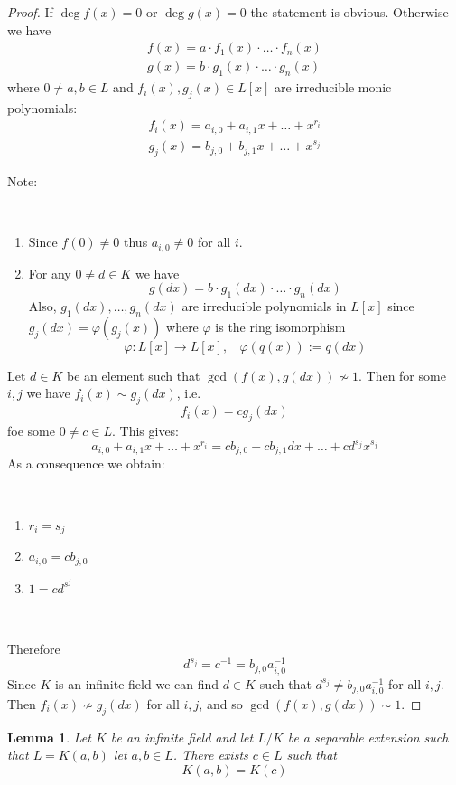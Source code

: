 \documentclass[12pt, letterpaper, oneside]{article}
\theoremstyle{plain}
\newtheorem{lemma}[theorem]{Lemma}
\theoremstyle{definition}
\newcommand{\benu}{\begin{enumerate}}
\newcommand{\eenu}{\end{enumerate}}
\newcommand{\vs}{\vskip 5mm}
\newcommand{\isep}[1][0]{\setlength{\itemsep}{#1 mm}}
\begin{document}
\begin{proof}
If $\deg f(x) = 0$ or $\deg g(x)=0$ the statement is obvious. 
Otherwise we have 
\begin{align*}
f(x) = a\cdot f_{1}(x)\cdot {\dots}\cdot f_{n}(x)\\
g(x) = b\cdot g_{1}(x)\cdot {\dots}\cdot g_{n}(x)
\end{align*} 
where $0\neq a, b\in L$ and $f_{i}(x), g_{j}(x)\in L[x]$ are irreducible monic polynomials:
\begin{align*}
f_{i}(x) = a_{i, 0} + a_{i, 1}x+ {\dots} + x^{r_{i}} \\
g_{j}(x) = b_{j, 0} + b_{j, 1}x+ {\dots} + x^{s_{j}}
\end{align*}

Note:

\vskip -13mm

\ 
\benu
\item Since $f(0)\neq 0$ thus $a_{i, 0}\neq 0$ for all $i$.
\item For any $0\neq d\in K$ we have 
$$g(dx) = b\cdot g_{1}(dx)\cdot {\dots}\cdot g_{n}(dx)$$
Also,  $g_{1}(dx), \dots, g_{n}(dx)$ are irreducible polynomials in $L[x]$ since 
$g_{j}(dx) = \varphi(g_{j}(x))$ where $\varphi$ is the ring isomorphism
$$\varphi\colon L[x] \to L[x], \ \ \ \ \varphi(q(x)) := q(dx)$$
\eenu

Let $d\in K$ be an element such that  $\gcd(f(x), g(dx))\not \sim 1$. Then for some $i, j$ we have 
$f_{i}(x)\sim g_{j}(dx)$, i.e. 
$$f_{i}(x) = cg_{j}(dx)$$
foe some $0\neq c \in L$. 
This gives:
$$a_{i, 0} + a_{i, 1}x + \dots + x^{r_{i}} = cb_{j, 0} + cb_{j, 1}dx + \dots +  cd^{s_{j}}x^{s_{j}}$$
As a consequence we obtain:

\vskip -13mm

\ 
\benu
\isep[0]
\item $r_{i} = s_{j}$ 
\item $a_{i, 0} = cb_{j, 0}$
\item $1 = cd^{s^{j}}$
\eenu
\ 

\vskip -13mm

Therefore 
$$d^{s_{j}} = c^{-1} = b_{j, 0}a_{i, 0}^{-1} $$
Since $K$ is an infinite field we can find $d\in K$ such that $d^{s_{j}}\neq b_{j, 0}a_{i, 0}^{-1}$
for all $i, j$. Then $f_{i}(x)\not\sim g_{j}(dx)$ for all $i, j$, and so $\gcd(f(x), g(dx))\sim 1$.

\end{proof}


\vs\vs

\begin{lemma}
\label{LEMMA_SEPEXTISSIMPLEFOR2}
Let $K$ be an infinite field and let $L/K$ be a separable extension such that $L= K(a, b)$
 let $a, b\in L$. There exists $c\in L$ such that 
$$K(a, b) = K(c)$$
\end{lemma}
\end{document}
